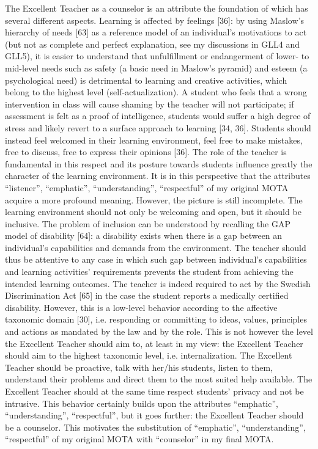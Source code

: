 \documentclass[
  a4paper, 
]{fortysecondscv}
\begin{document}
The Excellent Teacher as a counselor is an attribute the foundation of which has several different aspects. Learning is affected by feelings [36]: by using Maslow’s hierarchy of needs [63] as a reference model of an individual’s motivations to act (but not as complete and perfect explanation, see my discussions in GLL4 and GLL5), it is easier to understand that unfulfillment or endangerment of lower- to mid-level needs such as safety (a basic need in Maslow’s pyramid) and esteem (a psychological need) is detrimental to learning and creative activities, which belong to the highest level (self-actualization). A student who feels that a wrong intervention in class will cause shaming by the teacher will not participate; if assessment is felt as a proof of intelligence, students would suffer a high degree of stress and likely revert to a surface approach to learning [34, 36]. Students should instead feel welcomed in their learning environment, feel free to make mistakes, free to discuss, free to express their opinions [36]. The role of the teacher is fundamental in this respect and its posture towards students influence greatly the character of the learning environment. It is in this perspective that the attributes “listener”, “emphatic”, “understanding”, “respectful” of my original MOTA acquire a more profound meaning. However, the picture is still incomplete. The learning environment should not only be welcoming and open, but it should be inclusive. The problem of inclusion can be understood by recalling the GAP model of disability [64]: a disability exists when there is a gap between an individual’s capabilities and demands from the environment. The teacher should thus be attentive to any case in which such gap between individual’s capabilities and learning activities’ requirements prevents the student from achieving the intended learning outcomes. The teacher is indeed required to act by the Swedish Discrimination Act [65] in the case the student reports a medically certified disability. However, this is a low-level behavior according to the affective taxonomic domain [30], i.e. responding or committing to ideas, values, principles and actions as mandated by the law and by the role. This is not however the level the Excellent Teacher should aim to, at least in my view: the Excellent Teacher should aim to the highest taxonomic level, i.e. internalization. The Excellent Teacher should be proactive, talk with her/his students, listen to them, understand their problems and direct them to the most suited help available. The Excellent Teacher should at the same time respect students’ privacy and not be intrusive. This behavior certainly builds upon the attributes “emphatic”, “understanding”, “respectful”, but it goes further: the Excellent Teacher should be a counselor. This motivates the substitution of “emphatic”, “understanding”, “respectful” of my original MOTA with “counselor” in my final MOTA.
\end{document}
